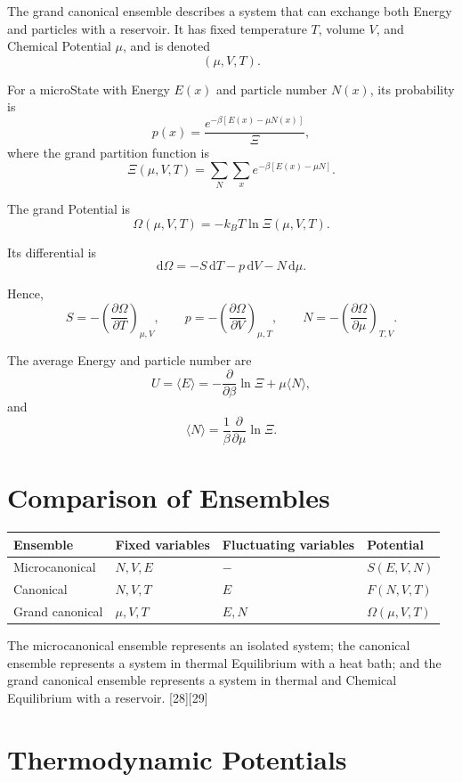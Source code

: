 \documentclass[a4paper, 10pt, onepage]{elegantbook}
\begin{document}
{The grand canonical ensemble describes a system that can exchange both Energy
and particles with a reservoir. It has fixed temperature \(T\), volume \(V\),
and Chemical Potential \(\mu\), and is denoted
\[
(\mu,V,T).
\]

For a microState with Energy \(E(x)\) and particle number \(N(x)\), its
probability is
\[
p(x)
=
\frac{e^{-\beta[E(x)-\mu N(x)]}}{\Xi},
\]
where the grand partition function is
\[
\Xi(\mu,V,T)
=
\sum_N\sum_x
e^{-\beta[E(x)-\mu N]}.
\]

The grand Potential is
\[
\Omega(\mu,V,T)
=
-k_BT\ln\Xi(\mu,V,T).
\]

Its differential is
\[
\mathrm d\Omega
=
-S\,\mathrm dT
-p\,\mathrm dV
-N\,\mathrm d\mu.
\]

Hence,
\[
S=-\left(\frac{\partial\Omega}{\partial T}\right)_{\mu,V},
\qquad
p=-\left(\frac{\partial\Omega}{\partial V}\right)_{\mu,T},
\qquad
N=-\left(\frac{\partial\Omega}{\partial\mu}\right)_{T,V}.
\]

The average Energy and particle number are
\[
U
=
\langle E\rangle
=
-\frac{\partial}{\partial\beta}\ln\Xi+\mu\langle N\rangle,
\]
and
\[
\langle N\rangle
=
\frac{1}{\beta}
\frac{\partial}{\partial\mu}\ln\Xi.
\]

\section{Comparison of Ensembles}

\begin{center}
\begin{tabular}{llll}
\hline
Ensemble & Fixed variables & Fluctuating variables & Potential \\
\hline
Microcanonical & \(N,V,E\) & \(-\) & \(S(E,V,N)\) \\
Canonical & \(N,V,T\) & \(E\) & \(F(N,V,T)\) \\
Grand canonical & \(\mu,V,T\) & \(E,N\) & \(\Omega(\mu,V,T)\) \\
\hline
\end{tabular}
\end{center}

The microcanonical ensemble represents an isolated system; the canonical
ensemble represents a system in thermal Equilibrium with a heat bath; and the
grand canonical ensemble represents a system in thermal and Chemical Equilibrium
with a reservoir. [28][29]

\section*{Thermodynamic Potentials}

}
\end{document}
